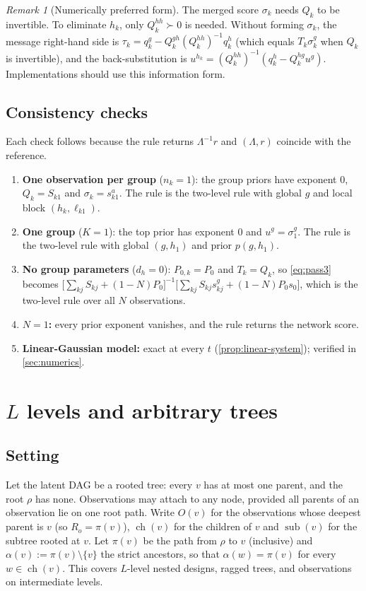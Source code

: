 \documentclass[11pt]{article}
\theoremstyle{definition}
\theoremstyle{remark}
\newtheorem{remark}{Remark}
\newcommand{\ch}{\operatorname{ch}}
\newcommand{\sub}{\operatorname{sub}}
\begin{document}
\begin{remark}[Numerically preferred form]
The merged score $\sigma_k$ needs $Q_k$ to be invertible. To eliminate $h_k$,
only $Q^{hh}_k\succ0$ is needed. Without forming $\sigma_k$, the message
right-hand side is $\tau_k=q_k^g-Q_k^{gh}(Q_k^{hh})^{-1}q_k^h$ (which equals
$T_k\sigma_k^g$ when $Q_k$ is invertible), and the back-substitution is
$u^{h_k}=(Q_k^{hh})^{-1}(q_k^h-Q_k^{hg}u^g)$. Implementations should use this
information form.
\end{remark}

\subsection{Consistency checks}

Each check follows because the rule returns $\Lambda^{-1}r$ and $(\Lambda,r)$
coincide with the reference.
\begin{enumerate}
\item \textbf{One observation per group} ($n_k=1$): the group priors have
 exponent $0$, $Q_k=S_{k1}$ and $\sigma_k=s^a_{k1}$. The rule is the two-level
 rule with global $g$ and local block $(h_k,\ell_{k1})$.
\item \textbf{One group} ($K=1$): the top prior has exponent $0$ and
 $u^g=\sigma^g_1$. The rule is the two-level rule with global $(g,h_1)$ and prior
 $p(g,h_1)$.
\item \textbf{No group parameters} ($d_h=0$): $P_{0,k}=P_0$ and $T_k=Q_k$, so
 \eqref{eq:pass3} becomes
 $\big[\sum_{kj}S_{kj}+(1-N)P_0\big]^{-1}\big[\sum_{kj}S_{kj}s^g_{kj}+(1-N)P_0s_0\big]$,
 which is the two-level rule over all $N$ observations.
\item \textbf{$N=1$:} every prior exponent vanishes, and the rule returns the network score.
\item \textbf{Linear-Gaussian model:} exact at every $t$ (\cref{prop:linear-system}); verified in \cref{sec:numerics}.
\end{enumerate}

\section{$L$ levels and arbitrary trees}\label{sec:tree}

\subsection{Setting}
Let the latent DAG be a rooted tree: every $v$ has at most one parent, and the
root $\rho$ has none. Observations may attach to any node, provided all parents
of an observation lie on one root path. Write $O(v)$ for the
observations whose deepest parent is $v$ (so $R_o=\pi(v)$), $\ch(v)$ for the
children of $v$ and $\sub(v)$ for the subtree rooted at $v$. Let $\pi(v)$ be the
path from $\rho$ to $v$ (inclusive) and $\alpha(v):=\pi(v)\setminus\{v\}$ the
strict ancestors, so that $\alpha(w)=\pi(v)$ for every $w\in\ch(v)$. This covers
$L$-level nested designs, ragged trees, and observations on intermediate levels.
\end{document}
